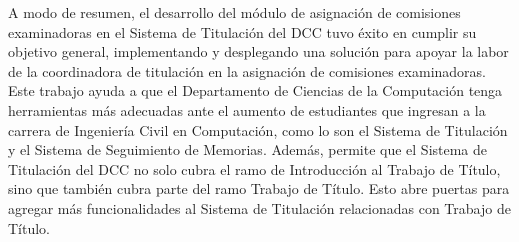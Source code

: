 A modo de resumen, el desarrollo del módulo de asignación de comisiones examinadoras en el
Sistema de Titulación del DCC tuvo éxito en cumplir su objetivo general, implementando y
desplegando una solución para apoyar la labor de la coordinadora de titulación en la
asignación de comisiones examinadoras. Este trabajo ayuda a que el Departamento de
Ciencias de la Computación tenga herramientas más adecuadas ante el aumento de
estudiantes que ingresan a la carrera de Ingeniería Civil en Computación, como lo son el
Sistema de Titulación y el Sistema de Seguimiento de Memorias. Además, permite que el
Sistema de Titulación del DCC no solo cubra el ramo de Introducción al Trabajo de Título,
sino que también cubra parte del ramo Trabajo de Título. Esto abre puertas para agregar
más funcionalidades al Sistema de Titulación relacionadas con Trabajo de Título.